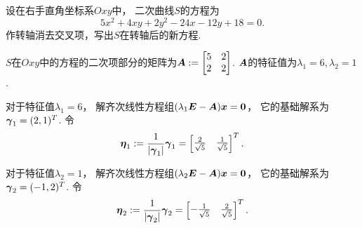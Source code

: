 \begin{example}\label{example:二次曲线方程的化简及其类型.例1}
设在右手直角坐标系\(Oxy\)中，
二次曲线\(S\)的方程为\begin{equation*}
	5x^2 + 4xy + 2y^2 - 24x - 12y + 18 = 0.
\end{equation*}
作转轴消去交叉项，写出\(S\)在转轴后的新方程.
\begin{solution}
\(S\)在\(Oxy\)中的方程的二次项部分的矩阵为\(
	\boldsymbol{A} := \begin{bmatrix}
		5 & 2 \\
		2 & 2
	\end{bmatrix}
\).
\(\boldsymbol{A}\)的特征值为\(
	\lambda_1 = 6,
	\lambda_2 = 1
\).

对于特征值\(\lambda_1 = 6\)，
解齐次线性方程组\((\lambda_1 \boldsymbol{E} - \boldsymbol{A}) \boldsymbol{x} = \boldsymbol0\)，
它的基础解系为\(\boldsymbol\gamma_1 = (2,1)^T\).
令\begin{equation*}
	\boldsymbol\eta_1
	:= \frac1{\abs{\boldsymbol\gamma_1}} \boldsymbol\gamma_1
	= \begin{bmatrix}
		\frac2{\sqrt5} & \frac1{\sqrt5}
	\end{bmatrix}^T.
\end{equation*}

对于特征值\(\lambda_2 = 1\)，
解齐次线性方程组\((\lambda_2 \boldsymbol{E} - \boldsymbol{A}) \boldsymbol{x} = \boldsymbol0\)，
它的基础解系为\(\boldsymbol\gamma_2 = (-1,2)^T\).
令\begin{equation*}
	\boldsymbol\eta_2
	:= \frac1{\abs{\boldsymbol\gamma_2}} \boldsymbol\gamma_2
	= \begin{bmatrix}
		-\frac1{\sqrt5} & \frac2{\sqrt5}
	\end{bmatrix}^T.
\end{equation*}


\end{solution}
\end{example}
